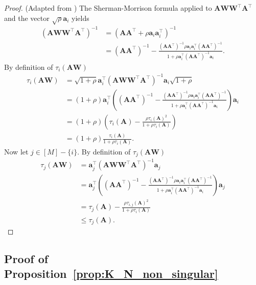 \documentclass[twoside,11pt]{book}
\numberwithin{theorem}{chapter}
\numberwithin{definition}{chapter}
\numberwithin{proposition}{chapter}
\numberwithin{corollary}{chapter}
\numberwithin{example}{chapter}
\numberwithin{lemma}{chapter}
\numberwithin{assumption}{chapter}
\DeclareMathOperator{\Tran}{\intercal}
\begin{document}
\begin{proof}(Adapted from \cite{Coh15})
The Sherman-Morrison formula applied to $\bm{A}\bm{W}\bm{W}^{\Tran}\bm{A}^{\Tran}$ and the vector $\sqrt{\rho} \bm{a}_{i}$ yields
\begin{align}
(\bm{A}\bm{W}\bm{W}^{\Tran}\bm{A}^{\Tran})^{-1} &  = (\bm{A}\bm{A}^{\Tran} + \rho \bm{a}_{i}\bm{a}_{i}^{\Tran})^{-1} \\
& = (\bm{A}\bm{A}^{\Tran})^{-1} - \frac{(\bm{A}\bm{A}^{\Tran})^{-1}\rho \bm{a}_{i}\bm{a}_{i}^{\Tran} (\bm{A}\bm{A}^{\Tran})^{-1}}{1+ \rho \bm{a}_{i}^{\Tran}(\bm{A}\bm{A}^{\Tran})^{-1}\bm{a}_{i}}.
\end{align}
By definition of $\tau_{i}(\bm{A}\bm{W})$
\begin{align}
\tau_{i}(\bm{A}\bm{W}) & = \sqrt{1 + \rho} \bm{a}_{i}^{\Tran}(\bm{A}\bm{W}\bm{W}^{\Tran}\bm{A}^{\Tran})^{-1}\bm{a}_{i}\sqrt{1 + \rho}\\
& = (1+\rho)\bm{a}_{i}^{\Tran} \left( (\bm{A}\bm{A}^{\Tran})^{-1} - \frac{(\bm{A}\bm{A}^{\Tran})^{-1}\rho \bm{a}_{i}\bm{a}_{i}^{\Tran} (\bm{A}\bm{A}^{\Tran})^{-1}}{1+ \rho \bm{a}_{i}^{\Tran}(\bm{A}\bm{A}^{\Tran})^{-1}\bm{a}_{i}} \right) \bm{a}_{i} \nonumber\\
& = (1+\rho) \left(\tau_{i}(\bm{A}) - \frac{\rho \tau_{i}(\bm{A})^{2}}{1+\rho \tau_{i}(\bm{A})} \right) \nonumber\\
& = (1+\rho)\frac{\tau_{i}(\bm{A})}{1+\rho \tau_{i}(\bm{A})} \nonumber.
\end{align}
Now let $j \in [M]-\{i\}$. By definition of $\tau_{j}(\bm{A}\bm{W})$
\begin{align}
\tau_{j}(\bm{A}\bm{W}) & =  \bm{a}_{j}^{\Tran}(\bm{A}\bm{W}\bm{W}^{\Tran}\bm{A}^{\Tran})^{-1}\bm{a}_{j}\\
& = \bm{a}_{j}^{\Tran} \left( (\bm{A}\bm{A}^{\Tran})^{-1} - \frac{(\bm{A}\bm{A}^{\Tran})^{-1}\rho \bm{a}_{i}\bm{a}_{i}^{\Tran} (\bm{A}\bm{A}^{\Tran})^{-1}}{1+ \rho \bm{a}_{i}^{\Tran}(\bm{A}\bm{A}^{\Tran})^{-1}\bm{a}_{i}} \right) \bm{a}_{j} \nonumber\\
& =  \tau_{j}(\bm{A}) - \frac{\rho \tau_{i,j}(\bm{A})^{2}}{1+\rho \tau_{i}(\bm{A})} \nonumber\\
& \leq \tau_{j}(\bm{A}) \nonumber.
\end{align}
\end{proof}


\subsection{Proof of Proposition~\ref{prop:K_N_non_singular}}\label{app:K_N_non_singular}
\end{document}
